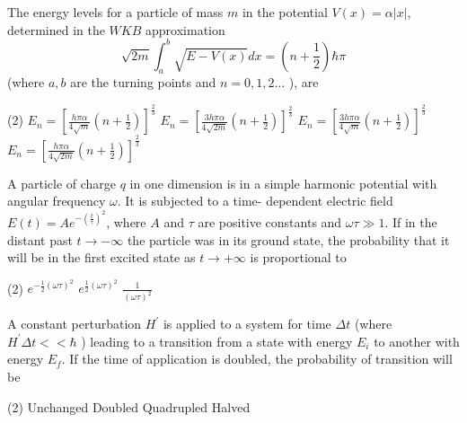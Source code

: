 \begin{enumerate}
\begin{minipage}{\textwidth}
	\item The energy levels for a particle of mass $m$ in the potential $V(x)=\alpha|x|$, determined in the $W K B$ approximation
	$$
	\sqrt{2 m} \int_{a}^{b} \sqrt{E-V(x)} d x=\left(n+\frac{1}{2}\right) \hbar \pi
	$$
	(where $a, b$ are the turning points and $n=0,1,2 \ldots$ ), are
\end{minipage}
\begin{tasks}(2)
	\task[\textbf{A.}] $E_{n}=\left[\frac{h \pi \alpha}{4 \sqrt{m}}\left(n+\frac{1}{2}\right)\right]^{\frac{2}{3}}$
	\task[\textbf{B.}]$E_{n}=\left[\frac{3 h \pi \alpha}{4 \sqrt{2 m}}\left(n+\frac{1}{2}\right)\right]^{\frac{2}{3}}$
	\task[\textbf{C.}]$E_{n}=\left[\frac{3 h \pi \alpha}{4 \sqrt{m}}\left(n+\frac{1}{2}\right)\right]^{\frac{2}{3}}$
	\task[\textbf{D.}] $E_{n}=\left[\frac{h \pi \alpha}{4 \sqrt{2 m}}\left(n+\frac{1}{2}\right)\right]^{\frac{2}{3}}$
\end{tasks}
\begin{minipage}{\textwidth}
	\item A particle of charge $q$ in one dimension is in a simple harmonic potential with angular frequency $\omega$. It is subjected to a time- dependent electric field $E(t)=A e^{-\left(\frac{t}{\tau}\right)^{2}}$, where $A$ and $\tau$ are positive constants and $\omega \tau \gg 1$. If in the distant past $t \rightarrow-\infty$ the particle was in its ground state, the probability that it will be in the first excited state as $t \rightarrow+\infty$ is proportional to
\end{minipage}
\begin{tasks}(2)
	\task[\textbf{A.}] $e^{-\frac{1}{2}(\omega \tau)^{2}}$
	\task[\textbf{B.}]$e^{\frac{1}{2}(\omega \tau)^{2}}$
	\task[\textbf{D.}]$\frac{1}{(\omega \tau)^{2}}$
\end{tasks}
\begin{minipage}{\textwidth}
	\item A constant perturbation $H^{\prime}$ is applied to a system for time $\Delta t$ (where $H^{\prime} \Delta t<<\hbar$ ) leading to a transition from a state with energy $E_{i}$ to another with energy $E_{f}$. If the time of application is doubled, the probability of transition will be
\end{minipage}
\begin{tasks}(2)
	\task[\textbf{A.}] Unchanged
	\task[\textbf{B.}]Doubled
	\task[\textbf{C.}]Quadrupled
	\task[\textbf{D.}]Halved
\end{tasks}

\end{enumerate}
